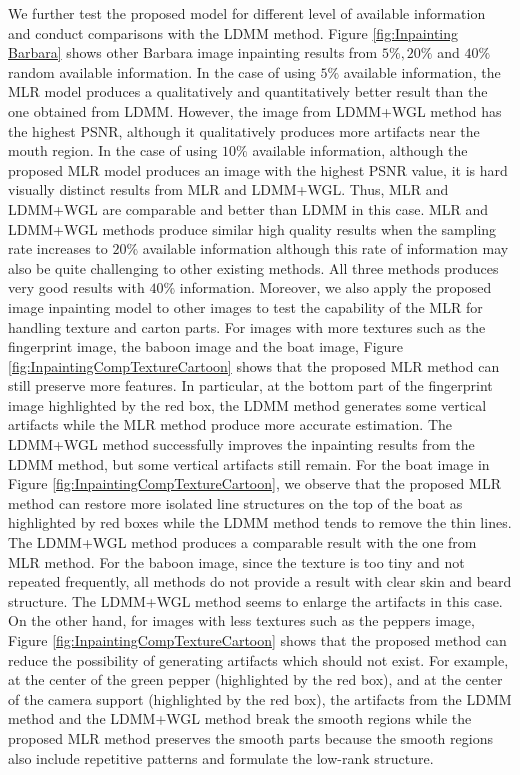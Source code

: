 \documentclass[letterpaper,10pt]{article}
\begin{document}
We further test the proposed model for different level of available information and conduct comparisons with the LDMM method. Figure \ref{fig:Inpainting Barbara} shows other Barbara image inpainting results from $5\%, 20\%$ and $40\%$ random available information. In the case of using $5\%$ available information, the MLR model produces a qualitatively and quantitatively better result than the one obtained from LDMM. However, the image from LDMM+WGL method has the highest PSNR, although it qualitatively produces more artifacts near the mouth region. In the case of using $10\%$ available information, although the proposed MLR model produces an image with the highest PSNR value, it is hard visually distinct results from MLR and LDMM+WGL. Thus, MLR and LDMM+WGL are comparable and better than LDMM in this case. MLR and LDMM+WGL methods produce similar high quality results when the sampling rate increases to $20\%$ available information although this rate of information may also be quite challenging to other existing methods. All three methods produces very good results with $40\%$ information. Moreover, we also apply the proposed image inpainting model to other images to test the capability of the MLR for handling texture and carton parts. For images with more textures such as the fingerprint image, the baboon image and the boat image, Figure \ref{fig:InpaintingCompTextureCartoon} shows that the proposed MLR method can still preserve more features. In particular, at the bottom part of the fingerprint image highlighted by the red box, the LDMM method generates some vertical artifacts while the MLR method produce more accurate estimation. The LDMM+WGL method successfully improves the inpainting results from the LDMM method, but some vertical artifacts still remain. For the boat image in Figure \ref{fig:InpaintingCompTextureCartoon}, we observe that the proposed MLR method can restore more isolated line structures on the top of the boat as highlighted by red boxes while the LDMM method tends to remove the thin lines. The LDMM+WGL method produces a comparable result with the one from MLR method. For the baboon image, since the texture is too tiny and not repeated frequently, all methods do not provide a result with clear skin and beard structure. The LDMM+WGL method seems to enlarge the artifacts in this case. On the other hand, for images with less textures such as the peppers image, Figure \ref{fig:InpaintingCompTextureCartoon} shows that the proposed method can reduce the possibility of generating artifacts which should not exist. For example, at the center of the green pepper (highlighted by the red box), and at the center of the camera support (highlighted by the red box), the artifacts from the LDMM method and the LDMM+WGL method break the smooth regions while the proposed MLR method preserves the smooth parts because the smooth regions also include repetitive patterns and formulate the low-rank structure.
\end{document}

